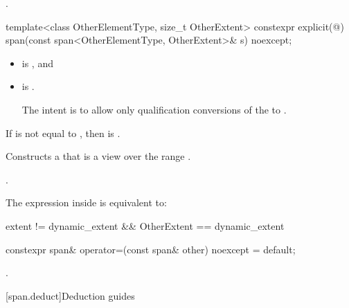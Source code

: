 \begin{itemdescr}
\pnum
\ensures
{}.
\end{itemdescr}

%
\begin{itemdecl}
template<class OtherElementType, size_t OtherExtent>
  constexpr explicit(@\seebelow@) span(const span<OtherElementType, OtherExtent>& s) noexcept;
\end{itemdecl}

\begin{itemdescr}
\pnum
\constraints
\begin{itemize}
\item {} \tcode{||}  \tcode{||}  is , and
\item {} is .
\begin{note}
The intent is to allow only qualification conversions
of the  to .
\end{note}
\end{itemize}

\pnum
\hardexpects
If  is not equal to ,
then  is .

\pnum
\effects
Constructs a  that is a view over the range
.

\pnum
\ensures
{}.

\pnum
\remarks
The expression inside  is equivalent to:
\begin{codeblock}
extent != dynamic_extent && OtherExtent == dynamic_extent
\end{codeblock}
\end{itemdescr}

%
\begin{itemdecl}
constexpr span& operator=(const span& other) noexcept = default;
\end{itemdecl}

\begin{itemdescr}
\pnum
\ensures
{}.
\end{itemdescr}

[span.deduct]{Deduction guides}

